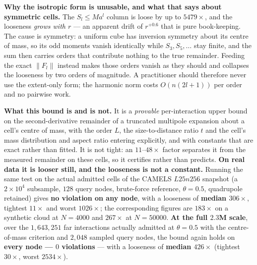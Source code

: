 \noindent\textbf{Why the isotropic form is unusable, and what that says about symmetric cells.} The
$S_l\le Ma^l$ column is loose by up to $5479\times$, and the looseness \emph{grows with $r$} --- an
apparent drift of $r^{+0.6}$ that is pure book-keeping. The cause is symmetry: a uniform cube has
inversion symmetry about its centre of mass, so its odd moments vanish identically while
$S_3,S_5,\dots$ stay finite, and the sum then carries orders that contribute nothing to the true
remainder. Feeding the exact $\|F_l\|$ instead makes those orders vanish as they should and collapses
the looseness by two orders of magnitude. A practitioner should therefore never use the
extent-only form; the harmonic norm costs $O(n(2l+1))$ per order and no pairwise work.

\noindent\textbf{What this bound is and is not.} It is a \emph{provable} per-interaction upper bound
on the second-derivative remainder of a truncated multipole expansion about a cell's centre of mass,
with the order $L$, the size-to-distance ratio $t$ and the cell's mass distribution and aspect ratio
entering explicitly, and with constants that are exact rather than fitted. It is not tight: an
$11$--$48\times$ factor separates it from the measured remainder on these cells, so it certifies
rather than predicts. \textbf{On real data it is looser still, and the looseness is not a constant.}
Running the same test on the actual admitted cells of the CAMELS $L25n256$ snapshot (a $2\times10^{4}$
subsample, $128$ query nodes, brute-force reference, $\theta=0.5$, quadrupole retained) gives
\textbf{no violation on any node}, with a looseness of \textbf{median $306\times$}, tightest $11\times$
and worst $1026\times$; the corresponding figures are $183\times$ on a synthetic cloud at
$N=4000$ and $267\times$ at $N=50000$. \textbf{At the full $2.3$M scale}, over the $1{,}643{,}251$ far
interactions actually admitted at $\theta=0.5$ with the centre-of-mass criterion and $2{,}048$ sampled
query nodes, the bound again holds on \textbf{every node --- $0$ violations} --- with a looseness of
\textbf{median $426\times$} (tightest $30\times$, worst $2534\times$).

